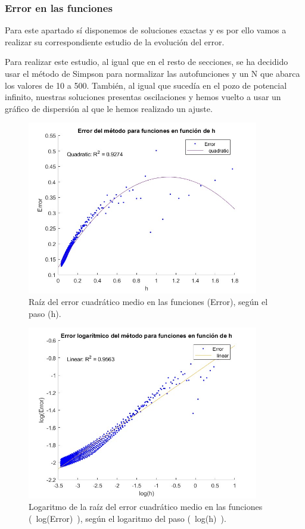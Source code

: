 \documentclass[12pt]{article}
\begin{document}
\subsubsection{Error en las funciones}
Para este apartado sí disponemos de soluciones exactas y es 
por ello vamos a realizar su correspondiente estudio de la 
evolución del error. \\
\par
Para realizar este estudio, al igual que en el resto de secciones, 
se ha decidido usar el método de Simpson para normalizar las 
autofunciones y un N que abarca los valores de 10 a 500. 
También, al igual que sucedía en el pozo de potencial 
infinito, nuestras soluciones presentas oscilaciones y hemos 
vuelto a usar un gráfico de dispersión al que le hemos realizado 
un ajuste.
\begin{figure}[H]
    \centering
    \includegraphics[width=0.9\textwidth]{func_finito.jpg}
    \caption{Raíz del error cuadrático medio en las funciones (Error), según el paso (h).}
\end{figure}    
\begin{figure}[H]
    \centering
    \includegraphics[width=0.9\textwidth]{log_func_finito.jpg}
    \caption{Logaritmo de la raíz del error cuadrático medio en las funciones (~log(Error)~), según el  logaritmo del paso (~log(h)~).}
\end{figure}  
\end{document}
